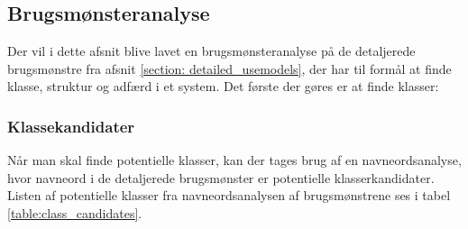 \subsection{Brugsmønsteranalyse}
Der vil i dette afsnit blive lavet en brugsmønsteranalyse på de detaljerede brugsmønstre fra afsnit \ref{section: detailed_usemodels}, der har til formål at finde klasse, struktur og adfærd i et system. Det første der gøres er at finde klasser:

\subsubsection{Klassekandidater}
Når man skal finde potentielle klasser, kan der tages brug af en navneordsanalyse, hvor navneord i de detaljerede brugsmønster er potentielle klasserkandidater. Listen af potentielle klasser fra navneordsanalysen af brugsmønstrene ses i tabel \ref{table:class_candidates}.

